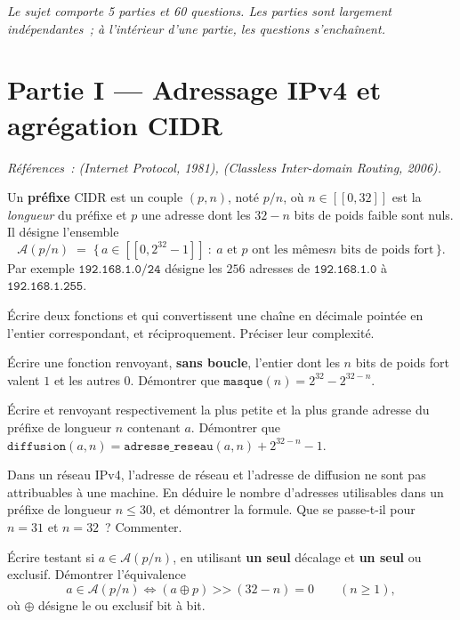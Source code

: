 \documentclass[11pt,a4paper]{article}
\begin{document}
\bigskip
\noindent\emph{Le sujet comporte 5 parties et 60 questions. Les parties sont largement
indépendantes~; à l'intérieur d'une partie, les questions s'enchaînent.}

\newpage

\section*{Partie I --- Adressage IPv4 et agrégation CIDR}

\emph{Références~:  (\emph{Internet Protocol}, 1981),  (\emph{Classless
Inter-domain Routing}, 2006).}

\medskip
Un \textbf{préfixe} CIDR est un couple $(p,n)$, noté $p/n$, où $n\in[\![0,32]\!]$ est la
\emph{longueur} du préfixe et $p$ une adresse dont les $32-n$ bits de poids faible sont
nuls. Il désigne l'ensemble
\[ \mathcal{A}(p/n) \;=\; \{\,a\in[\![0,2^{32}-1]\!] \ :\ \text{$a$ et $p$ ont les mêmes
$n$ bits de poids fort}\,\}. \]
Par exemple $\texttt{192.168.1.0/24}$ désigne les $256$ adresses de
$\texttt{192.168.1.0}$ à $\texttt{192.168.1.255}$.

\Q Écrire deux fonctions  et  qui convertissent
une chaîne en décimale pointée en l'entier correspondant, et réciproquement. Préciser leur
complexité.

\Q Écrire une fonction  renvoyant, \textbf{sans boucle}, l'entier dont les
$n$ bits de poids fort valent $1$ et les autres $0$. Démontrer que
$\texttt{masque}(n)=2^{32}-2^{32-n}$.

\Q Écrire  et  renvoyant respectivement la
plus petite et la plus grande adresse du préfixe de longueur $n$ contenant $a$. Démontrer
que $\texttt{diffusion}(a,n)=\texttt{adresse\_reseau}(a,n)+2^{32-n}-1$.

\Q Dans un réseau IPv4, l'adresse de réseau et l'adresse de diffusion ne sont pas
attribuables à une machine. En déduire le nombre d'adresses utilisables dans un préfixe de
longueur $n\le 30$, et démontrer la formule. Que se passe-t-il pour $n=31$ et $n=32$~?
Commenter.

\Q Écrire  testant si $a\in\mathcal{A}(p/n)$, en utilisant
\textbf{un seul} décalage et \textbf{un seul} ou exclusif. Démontrer l'équivalence
\[ a\in\mathcal{A}(p/n) \iff (a \oplus p)\ \texttt{>>}\ (32-n) = 0 \qquad (n\ge 1), \]
où $\oplus$ désigne le ou exclusif bit à bit.
\end{document}
